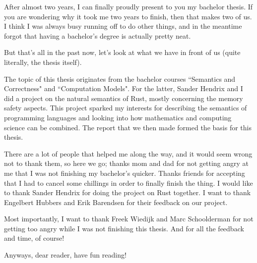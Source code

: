 After almost two years, I can finally proudly present to you my bachelor thesis. If you are wondering why it took me two years to finish, then that makes two of us. I think I was always busy running off to do other things, and in the meantime forgot that having a bachelor's degree is actually pretty neat. 

But that's all in the past now, let's look at what we have in front of us (quite literally, the thesis itself).

The topic of this thesis originates from the bachelor courses ``Semantics and Correctness" and ``Computation Models". For the latter, Sander Hendrix and I did a project on the natural semantics of Rust, mostly concerning the memory safety aspects. This project sparked my interests for describing the semantics of programming languages and looking into how mathematics and computing science can be combined. The report that we then made formed the basis for this thesis. 

There are a lot of people that helped me along the way, and it would seem wrong not to thank them, so here we go; thanks mom and dad for not getting angry at me that I was not finishing my bachelor's quicker. Thanks friends for accepting that I had to cancel some chillings in order to finally finish the thing. I would like to thank Sander Hendrix for doing the project on Rust together. I want to thank Engelbert Hubbers and Erik Barendsen for their feedback on our project.

Most importantly, I want to thank Freek Wiedijk and Marc Schoolderman for not getting too angry while I was not finishing this thesis. And for all the feedback and time, of course!

Anyways, dear reader, have fun reading!


%

%




